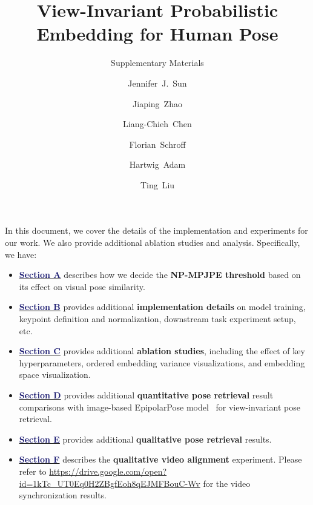 





\newcommand{\customizedparagraph}{\textbf}



\title{View-Invariant Probabilistic Embedding for Human Pose} \subtitle{Supplementary Materials}



\author{Jennifer~J.~Sun \and
Jiaping~Zhao \and
Liang-Chieh~Chen \and
Florian~Schroff \and
Hartwig~Adam \and
Ting~Liu}

\maketitle

In this document, we cover the details of the implementation and experiments for our work. We also provide additional ablation studies and analysis. Specifically, we have:
\begin{itemize}
    \item[\textbullet] \hyperref[sec:3d_visual_similarity]{\textbf{\textcolor{MidnightBlue}{Section A}}} describes how we decide the \textbf{NP-MPJPE threshold} based on its effect on visual pose similarity.
    \item[\textbullet] \hyperref[sec:implementation_details]{\textbf{\textcolor{MidnightBlue}{Section B}}} provides additional \textbf{implementation details} on model training, keypoint definition and normalization, downstream task experiment setup, etc.
    \item[\textbullet] \hyperref[sec:ablation]{\textbf{\textcolor{MidnightBlue}{Section C}}} provides additional \textbf{ablation studies}, including the effect of key hyperparameters, ordered embedding variance visualizations, and embedding space visualization.
    \item[\textbullet] \hyperref[sec:additional_comp]{\textbf{\textcolor{MidnightBlue}{Section D}}} provides additional \textbf{quantitative pose retrieval} result comparisons with image-based EpipolarPose model~\cite{kocabas2019self} for view-invariant pose retrieval.
    \item[\textbullet] \hyperref[sec:pose_retrieval_qres]{\textbf{\textcolor{MidnightBlue}{Section E}}} provides additional \textbf{qualitative pose retrieval} results.
    \item[\textbullet] \hyperref[sec:video_alignment_qres]{\textbf{\textcolor{MidnightBlue}{Section F}}} describes the \textbf{qualitative video alignment} experiment. Please refer to {\scriptsize{\url{https://drive.google.com/open?id=1kTc_UT0Eq0H2ZBgfEoh8qEJMFBouC-Wv}}} for the video synchronization results.
\end{itemize}

